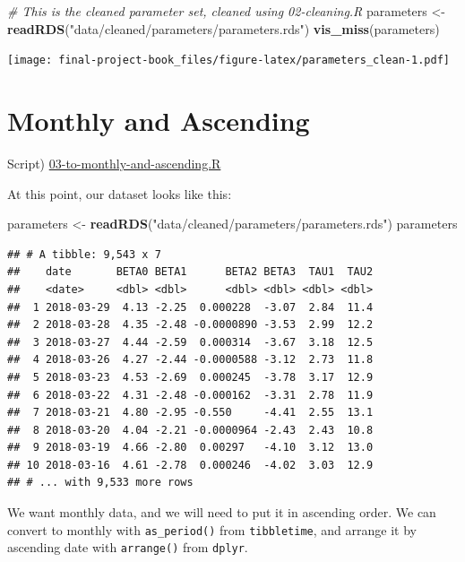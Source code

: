 \documentclass[]{book}
\newenvironment{Shaded}{\begin{snugshade}}{\end{snugshade}}
\newcommand{\CommentTok}[1]{\textcolor[rgb]{0.56,0.35,0.01}{\textit{#1}}}
\newcommand{\KeywordTok}[1]{\textcolor[rgb]{0.13,0.29,0.53}{\textbf{#1}}}
\newcommand{\NormalTok}[1]{#1}
\newcommand{\StringTok}[1]{\textcolor[rgb]{0.31,0.60,0.02}{#1}}
\theoremstyle{definition}
\theoremstyle{definition}
\theoremstyle{definition}
\theoremstyle{remark}
\begin{document}
\begin{Shaded}
\begin{Highlighting}[]
\CommentTok{# This is the cleaned parameter set, cleaned using 02-cleaning.R}
\NormalTok{parameters <-}\StringTok{ }\KeywordTok{readRDS}\NormalTok{(}\StringTok{"data/cleaned/parameters/parameters.rds"}\NormalTok{)}
\KeywordTok{vis_miss}\NormalTok{(parameters)}
\end{Highlighting}
\end{Shaded}

\texttt{[image: final-project-book\_files/figure-latex/parameters\_clean-1.pdf]}

\hypertarget{monthly}{%
\section{Monthly and Ascending}\label{monthly}}

Script)
\href{./R/03-to-monthly-and-ascending.R}{03-to-monthly-and-ascending.R}

At this point, our dataset looks like this:

\begin{Shaded}
\begin{Highlighting}[]
\NormalTok{parameters <-}\StringTok{ }\KeywordTok{readRDS}\NormalTok{(}\StringTok{"data/cleaned/parameters/parameters.rds"}\NormalTok{)}
\NormalTok{parameters}
\end{Highlighting}
\end{Shaded}

\begin{verbatim}
## # A tibble: 9,543 x 7
##    date       BETA0 BETA1      BETA2 BETA3  TAU1  TAU2
##    <date>     <dbl> <dbl>      <dbl> <dbl> <dbl> <dbl>
##  1 2018-03-29  4.13 -2.25  0.000228  -3.07  2.84  11.4
##  2 2018-03-28  4.35 -2.48 -0.0000890 -3.53  2.99  12.2
##  3 2018-03-27  4.44 -2.59  0.000314  -3.67  3.18  12.5
##  4 2018-03-26  4.27 -2.44 -0.0000588 -3.12  2.73  11.8
##  5 2018-03-23  4.53 -2.69  0.000245  -3.78  3.17  12.9
##  6 2018-03-22  4.31 -2.48 -0.000162  -3.31  2.78  11.9
##  7 2018-03-21  4.80 -2.95 -0.550     -4.41  2.55  13.1
##  8 2018-03-20  4.04 -2.21 -0.0000964 -2.43  2.43  10.8
##  9 2018-03-19  4.66 -2.80  0.00297   -4.10  3.12  13.0
## 10 2018-03-16  4.61 -2.78  0.000246  -4.02  3.03  12.9
## # ... with 9,533 more rows
\end{verbatim}

We want monthly data, and we will need to put it in ascending order. We
can convert to monthly with \texttt{as\_period()} from
\texttt{tibbletime}, and arrange it by ascending date with
\texttt{arrange()} from \texttt{dplyr}.
\end{document}
